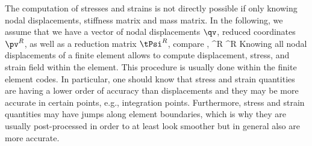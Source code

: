 %


%
The computation of stresses and strains is not directly possible if only knowing nodal displacements, stiffness matrix and mass matrix.
In the following, we assume that we have a vector of nodal displacements $\qv$, reduced coordinates $\pv^{R}$, as well as a reduction matrix $\tPsi^{R}$, compare ,
\be \label{theory:eigenmodes:HCB2}
  \qv \approx \tPsi^{R} \pv^{R} \eqDot
\ee
Knowing all nodal displacements of a finite element allows to compute displacement, stress, and strain field within the element. This procedure is usually done within the finite element codes.
In particular, one should know that stress and strain quantities are having a lower order of accuracy than displacements and they may be more accurate in certain points, e.g., integration points. Furthermore, stress and strain quantities may have jumps along element boundaries, which is why they are usually post-processed in order to at least look smoother but in general also are more accurate.

